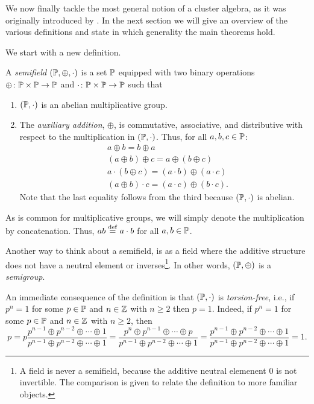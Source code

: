 We now finally tackle the most general notion of a cluster algebra, as it was
originally introduced by \textcite{FominZelevinsky2002CAF}. In the next section we will
give an overview of the various definitions and state in which generality the main
theorems hold.

\medskip

We start with a new definition.
\begin{definition}

	A \emph{semifield} $(\mathbb{P}, \oplus, \cdot)$ is a set
	$\mathbb{P}$ equipped with two binary operations $\oplus \colon \mathbb{P} \times
		\mathbb{P} \to \mathbb{P}$ and $\cdot \colon \mathbb{P} \times \mathbb{P} \to \mathbb{P}$ such that
	\begin{enumerate}
		\item $(\mathbb{P}, \cdot)$ is an abelian multiplicative group.
		\item The \emph{auxiliary addition}, $\oplus$, is commutative,
		      associative, and distributive with respect to the multiplication in $(\mathbb{P}, \cdot)$.
		      Thus, for all $a,b,c \in \mathbb{P}$:
		      \begin{align*}
			       & a \oplus b = b \oplus a                                \\
			       & (a \oplus b) \oplus c =  a \oplus (b \oplus c)         \\
			       & a \cdot (b \oplus c) = (a \cdot b) \oplus (a \cdot c)  \\
			       & (a \oplus b) \cdot c = (a \cdot c) \oplus (b \cdot c).
		      \end{align*}
		      Note that the last equality follows from the third because $(\mathbb{P}, \cdot)$ is abelian.
	\end{enumerate}
	As is common for multiplicative groups, we will simply denote the multiplication by
	concatenation. Thus, $ab \overset{\mathrm{def}}{=} a \cdot b$ for all $a, b \in \mathbb{P}$.
\end{definition}

Another way to think about a semifield, is as a field where the additive structure does
not have a neutral element or inverses\footnote{A field is never a semifield, because the additive neutral elemenent $0$ is not invertible. The comparison is given to relate the definition to more familiar objects.}. In other words, $(\mathbb{P}, \oplus)$ is a
\emph{semigroup}.

An immediate consequence of the definition is that $(\mathbb{P}, \cdot)$ is
\emph{torsion-free}, i.e., if $p^n = 1$ for some $p\in \mathbb{P}$
and $n \in \mathbb{Z}$ with $n\geq 2$ then $p = 1$. Indeed, if $p^n = 1$ for some $p \in
	\mathbb{P}$ and $n \in \mathbb{Z}$ with $n \geq 2$, then
\begin{equation*}
	p
	= p \frac{p^{n-1} \oplus p^{n-2} \oplus \cdots \oplus 1}{ p^{n-1} \oplus p^{n-2} \oplus \cdots \oplus 1}
	= \frac{p^n \oplus p^{n-1} \oplus \cdots \oplus p}{ p^{n-1} \oplus p^{n-2} \oplus \cdots \oplus 1}
	= \frac{p^{n-1} \oplus p^{n-2} \oplus \cdots \oplus 1}{ p^{n-1} \oplus p^{n-2} \oplus \cdots \oplus 1}
	=1.
\end{equation*}

